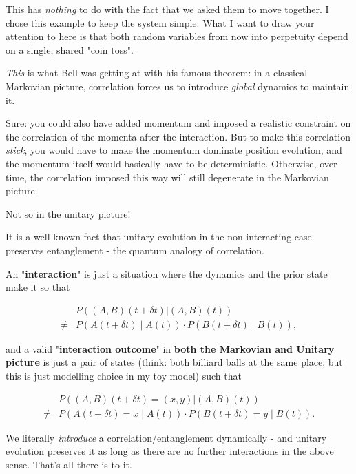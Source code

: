 \documentclass{article}
\begin{document}
This has \textit{nothing} to do with the fact that we asked them to move together. I chose this example to keep the system simple. What I want to draw your attention to here is that both random variables from now into perpetuity depend on a single, shared "coin toss".

\textit{This} is what Bell was getting at with his famous theorem: in a classical Markovian picture, correlation forces us to introduce \textit{global} dynamics to maintain it.

Sure: you could also have added momentum and imposed a realistic constraint on the correlation of the momenta after the interaction. But to make this correlation \textit{stick}, you would have to make the momentum dominate position evolution, and the momentum itself would basically have to be deterministic. Otherwise, over time, the correlation imposed this way will still degenerate in the Markovian picture.

Not so in the unitary picture!

It is a well known fact \cite{Hulpke_2006} that unitary evolution in the non-interacting case preserves entanglement - the quantum analogy of correlation.

An "\textbf{interaction}" is just a situation where the dynamics and the prior state make it so that

\begin{align*}
&P((A,B)(t+\delta t) | (A,B)(t)) \\ \neq &P(A(t+\delta t)\mid A(t))\cdot P(B(t+\delta t) \mid B(t)),
\end{align*}

and a valid "\textbf{interaction outcome}" in \textbf{both the Markovian and Unitary picture} is just a pair of states (think: both billiard balls at the same place, but this is just modelling choice in my toy model) such that

\begin{mdframed}
\begin{align*}
&P((A,B)(t+\delta t) = (x,y) | (A,B)(t)) \\ \neq &P(A(t+\delta t) = x\mid A(t))\cdot P(B(t+\delta t)=y \mid B(t)).
\end{align*}
\end{mdframed}

We literally \textit{introduce} a correlation/entanglement dynamically - and unitary evolution preserves it as long as there are no further interactions in the above sense. That's all there is to it.
\end{document}
